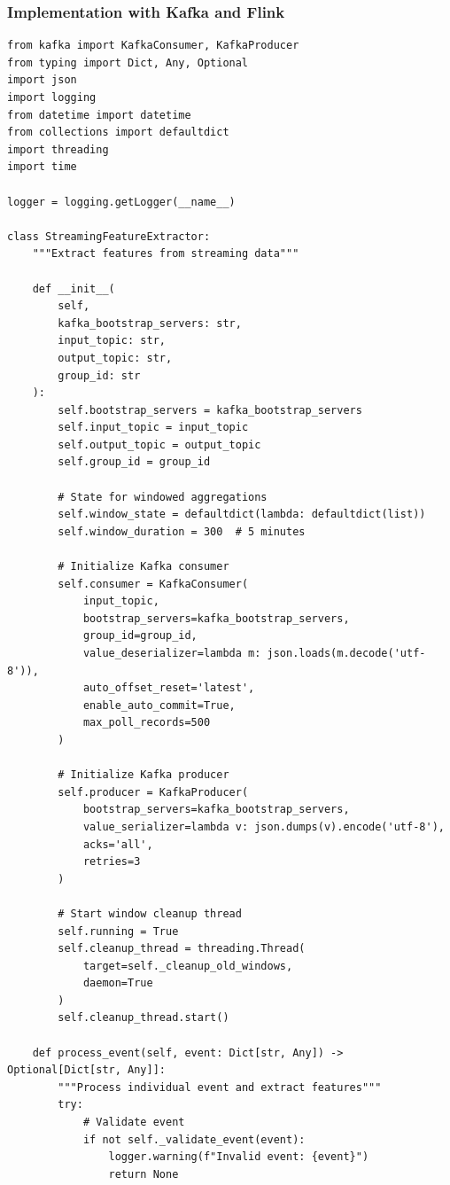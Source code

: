 \subsubsection{Implementation with Kafka and Flink}

\begin{lstlisting}[style=python, caption=Streaming Pipeline with Kafka]
from kafka import KafkaConsumer, KafkaProducer
from typing import Dict, Any, Optional
import json
import logging
from datetime import datetime
from collections import defaultdict
import threading
import time

logger = logging.getLogger(__name__)

class StreamingFeatureExtractor:
    """Extract features from streaming data"""

    def __init__(
        self,
        kafka_bootstrap_servers: str,
        input_topic: str,
        output_topic: str,
        group_id: str
    ):
        self.bootstrap_servers = kafka_bootstrap_servers
        self.input_topic = input_topic
        self.output_topic = output_topic
        self.group_id = group_id

        # State for windowed aggregations
        self.window_state = defaultdict(lambda: defaultdict(list))
        self.window_duration = 300  # 5 minutes

        # Initialize Kafka consumer
        self.consumer = KafkaConsumer(
            input_topic,
            bootstrap_servers=kafka_bootstrap_servers,
            group_id=group_id,
            value_deserializer=lambda m: json.loads(m.decode('utf-8')),
            auto_offset_reset='latest',
            enable_auto_commit=True,
            max_poll_records=500
        )

        # Initialize Kafka producer
        self.producer = KafkaProducer(
            bootstrap_servers=kafka_bootstrap_servers,
            value_serializer=lambda v: json.dumps(v).encode('utf-8'),
            acks='all',
            retries=3
        )

        # Start window cleanup thread
        self.running = True
        self.cleanup_thread = threading.Thread(
            target=self._cleanup_old_windows,
            daemon=True
        )
        self.cleanup_thread.start()

    def process_event(self, event: Dict[str, Any]) -> Optional[Dict[str, Any]]:
        """Process individual event and extract features"""
        try:
            # Validate event
            if not self._validate_event(event):
                logger.warning(f"Invalid event: {event}")
                return None


\end{lstlisting}
